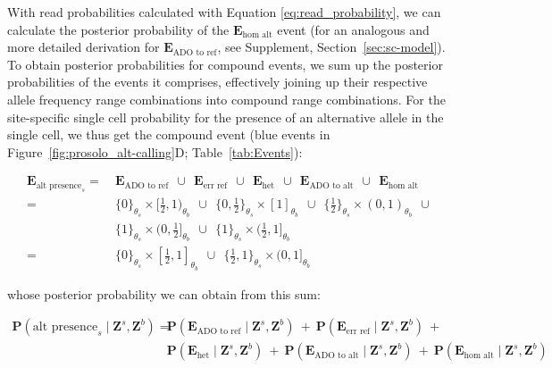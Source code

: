 \documentclass[fleqn,12pt,inline]{wlscirep}
\newcommand{\Prob}{{\mathbf{P}}}
\begin{document}
With read probabilities calculated with Equation \ref{eq:read_probability}, we can calculate the posterior probability of the $\boldsymbol{E}_{\text{hom alt}}$ event (for an analogous and more detailed derivation for $\boldsymbol{E}_{\text{ADO to ref}}$, see Supplement, Section~\ref{sec:sc-model}).
To obtain posterior probabilities for compound events, we sum up the posterior probabilities of the events it comprises, effectively joining up their respective allele frequency range combinations into compound range combinations.
For the site-specific single cell probability for the presence of an alternative allele in the single cell, we thus get the compound event (blue events in Figure~\ref{fig:prosolo_alt-calling}D; Table~\ref{tab:Events}):

\begin{equation}
 \label{eq:compound-event-alt-presence}
 \begin{split}
  \boldsymbol{E}_{\text{alt presence}_s}
  =~&\boldsymbol{E}_\text{ADO to ref}~~\cup~~
    \boldsymbol{E}_\text{err ref}~~\cup~~
    \boldsymbol{E}_\text{het}~~\cup~~
    \boldsymbol{E}_\text{ADO to alt}~~\cup~~
    \boldsymbol{E}_\text{hom alt} \\
  =~&\{0\}_{\theta_s} \times [\frac{1}{2}, 1)_{\theta_b}~~\cup~~
    \{0, \frac{1}{2}\}_{\theta_s} \times [1]_{\theta_b}~~\cup~~
    \{\frac{1}{2}\}_{\theta_s} \times (0,1)_{\theta_b}~~\cup~~\\
    &\{1\}_{\theta_s} \times (0,\frac{1}{2}]_{\theta_b}~~\cup~~
    \{1\}_{\theta_s} \times (\frac{1}{2},1]_{\theta_b} \\
  =~&\{0\}_{\theta_s} \times [\frac{1}{2},1]_{\theta_b}~~\cup~~
    \{\frac{1}{2},1\}_{\theta_s} \times (0,1]_{\theta_b}
 \end{split}
\end{equation}

whose posterior probability we can obtain from this sum:

\begin{equation}
 \label{eq:alt-posterior-prob}
 \begin{split}
  \Prob(\text{alt presence}_s \mid \boldsymbol{Z}^s,\boldsymbol{Z}^b) =~&
    \Prob(\boldsymbol{E}_{\text{ADO to ref}} \mid \boldsymbol{Z}^s,\boldsymbol{Z}^b)~+~ 
    \Prob(\boldsymbol{E}_{\text{err ref}} \mid \boldsymbol{Z}^s,\boldsymbol{Z}^b)~+ \\
  &\Prob(\boldsymbol{E}_{\text{het}} \mid \boldsymbol{Z}^s,\boldsymbol{Z}^b)~+~
  \Prob(\boldsymbol{E}_{\text{ADO to alt}} \mid \boldsymbol{Z}^s,\boldsymbol{Z}^b)~+~
  \Prob(\boldsymbol{E}_{\text{hom alt}} \mid \boldsymbol{Z}^s,\boldsymbol{Z}^b)
 \end{split}
\end{equation}
\end{document}
